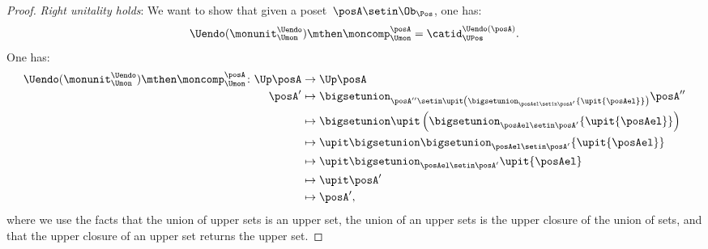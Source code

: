 \begin{proof}
    \emph{Right unitality holds}: We want to show that given a poset~$\posA\setin \Ob_\Pos$, one has:
    \begin{equation}
        \Uendo(\monunit_{\Umon}^{\Uendo})\mthen \moncomp_{\Umon}^{\posA}=\catid_{\UPos}^{\Uendo(\posA)}.
    \end{equation}
    One has:
    \begin{equation*}
        \begin{aligned}
            \Uendo(\monunit_{\Umon}^{\Uendo})\mthen \moncomp_{\Umon}^{\posA}\colon \Up \posA & \to \Up \posA \\
            \posA'                                                                           & \mapsto \bigsetunion_{\posA''\setin \upit \left( \bigsetunion_{\posAel \setin \posA'}\{ \upit \{\posAel\}\}\right)}\posA'' \\
                                                                                             & \mapsto \bigsetunion \upit \left( \bigsetunion_{\posAel \setin \posA'}\{\upit \{ \posAel\} \}\right) \\
                                                                                             & \mapsto \upit \bigsetunion   \bigsetunion_{\posAel \setin \posA'}\{\upit \{ \posAel\} \} \\
                                                                                             & \mapsto \upit \bigsetunion_{\posAel \setin \posA'}\upit \{ \posAel\} \\
                                                                                             & \mapsto \upit \posA' \\
                                                                                             & \mapsto \posA',
        \end{aligned}
    \end{equation*}
    where we use the facts that the union of upper sets is an upper set, the union of an upper sets is the upper closure of the union of sets, and that the upper closure of an upper set returns the upper set.


\end{proof}
